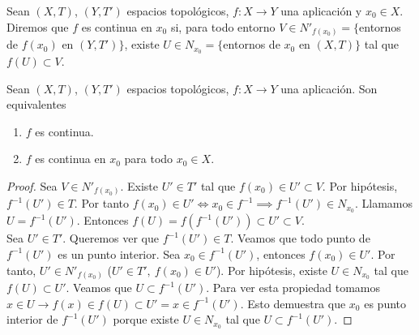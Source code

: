 \begin{ndef}
  Sean $(X,T)$, $(Y,T')$ espacios topológicos, $f: X \to Y$ una aplicación y $x_0 \in X$. Diremos que $f$ es continua en $x_0$ si, para todo entorno $V \in N'_{f(x_0)} = \{$entornos de $f(x_0)$ en $(Y,T')\}$, existe $U \in N_{x_0} = \{$entornos de $x_0$ en $(X,T)\}$ tal que $f(U) \subset V$.
\end{ndef}
\begin{properties}
    Sean $(X,T)$, $(Y,T')$ espacios topológicos, $f: X \to Y$ una aplicación. Son equivalentes
    \begin{enumerate}
        \item $f$ es continua.
        \item $f$ es continua en $x_0$ para todo $x_0 \in X$.
    \end{enumerate}
\end{properties}
\begin{proof}
   Sea $V \in N'_{f(x_0)}$. Existe $U' \in T'$ tal que $f(x_0) \in U' \subset V$. Por hipótesis, $f^{-1}(U') \in T$. Por tanto $f(x_0) \in U' \Leftrightarrow x_0 \in f^{-1} \implies f^{-1}(U') \in N_{x_0}$. Llamamos $U = f^{-1}(U')$. Entonces $f(U)=f(f^{-1}(U')) \subset U' \subset V$. \\
   Sea $U' \in T'$. Queremos ver que $f^{-1}(U') \in T$. Veamos que todo punto de $f^{-1}(U')$ es un punto interior. Sea $x_0 \in f^{-1}(U')$, entonces $f(x_0) \in U'$. Por tanto, $U' \in N'_{f(x_0)}$ ($U' \in T',\ f(x_0) \in U'$). Por hipótesis, existe $U \in N_{x_0}$ tal que $f(U) \subset U'$. Veamos que $U \subset f^{-1}(U')$. Para ver esta propiedad tomamos $x \in U \rightarrow f(x) \in f(U) \subset U' = x \in f^{-1}(U')$. 
  Esto demuestra que $x_0$ es punto interior de $f^{-1}(U')$ porque existe $U \in N_{x_0}$ tal que $U \subset f^{-1}(U')$.
\end{proof}


